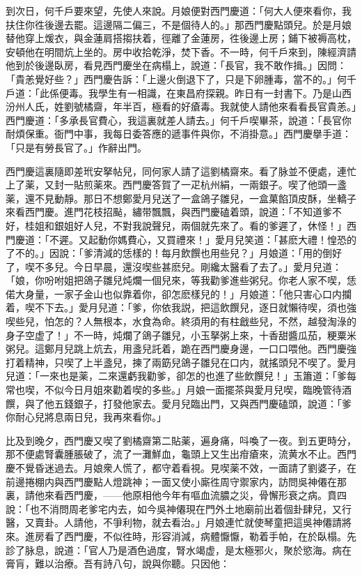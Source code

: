 到次日，何千戶要來望，先使人來說。月娘便對西門慶道：「何大人便來看你，我扶住你徃後邊去罷。這邊隔二偏三，不是個待人的。」那西門慶點頭兒。於是月娘替他穿上煖衣，與金蓮肩搭搊扶着，徑離了金蓮房，徃後邊上房；鋪下被褥高枕，安頓他在明間炕上坐的。房中收拾乾淨，焚下香。不一時，何千戶來到，陳經濟請他到於後邊臥房，看見西門慶坐在病榻上，說道：「長官，我不敢作揖。」因問：「貴恙覺好些？」西門慶告訴：「上邊火倒退下了，只是下卵腫毒，當不的。」何千戶道：「此係便毒。我學生有一相識，在東昌府探親。昨日有一封書下。乃是山西汾州人氏，姓劉號橘齋，年半百，極看的好瘡毒。我就使人請他來看看長官貴恙。」西門慶道：「多承長官費心，我這裏就差人請去。」何千戶喫畢茶，說道：「長官你耐煩保重。衙門中事，我每日委答應的遞事件與你，不消掛意。」西門慶擧手道：「只是有勞長官了。」作辭出門。

西門慶這裏隨即差玳安拏帖兒，同何家人請了這劉橘齋來。看了脉並不便處，連忙上了薬，又封一貼煎薬來。西門慶答賀了一疋杭州絹，一兩銀子。喫了他頭一盞薬，還不見動靜。那日不想鄭愛月兒送了一盒鴿子雛兒，一盒菓餡頂皮酥，坐轎子來看西門慶。進門花枝招颭，繡带飄飄，與西門慶磕着頭，說道：「不知道爹不好，桂姐和銀姐好人兒，不對我說聲兒，兩個就先來了。看的爹遲了，休怪！」西門慶道：「不遲。又起動你媽費心，又買禮來！」愛月兒笑道：「甚麽大禮！惶恐的了不的。」因說：「爹清減的恁樣的！每月飲饌也用些兒？」月娘道：「用的倒好了，喫不多兒。今日早晨，還沒喫些甚麽兒。剛纔太醫看了去了。」愛月兒道：「娘，你吩咐姐把鴿子雛兒炖爛一個兒來，等我勸爹進些粥兒。你老人家不喫，恁偌大身量，一家子金山也似靠着你，卻怎麽樣兒的！」月娘道：「他只害心口内攔着，喫不下去。」愛月兒道：「爹，你依我説，把這飲饌兒，逐日就懶待喫，須也強喫些兒，怕怎的？人無根本，水食為命。終須用的有柱戧些兒，不然，越發淘淥的身子空虚了！」不一時，炖爛了鴿子雛兒，小玉拏粥上來，十香甜醬瓜茄，粳粟米粥兒。這鄭月兒跳上炕去，用盞兒託着，跪在西門慶身邊，一口口喂他。西門慶強打着精神，只喫了上半盞兒，揀了兩筯兒鴿子雛兒在口内，就搖頭兒不喫了。愛月兒道：「一來也是薬，二來還虧我勸爹，卻怎的也進了些飲饌兒！」玉簫道：「爹每常也喫，不似今日月姐來勸着喫的多些。」月娘一面擺茶與愛月兒喫，臨晚管待酒饌，與了他五錢銀子，打發他家去。愛月兒臨出門，又與西門慶磕頭，說道：「爹你耐心兒將息兩日兒，我再來看你。」

比及到晚夕，西門慶又喫了劉橘齋第二貼薬，遍身痛，呌喚了一夜。到五更時分，那不便處腎囊腫脹破了，流了一灘鮮血，龜頭上又生出疳瘡來，流黄水不止。西門慶不覺昏迷過去。月娘衆人慌了，都守着看視。見喫薬不效，一面請了劉婆子，在前邊捲棚内與西門慶點人燈跳神；一面又使小廝徃周守禦家内，訪問吳神僊在那裏，請他來看西門慶，——他原相他今年有嘔血流膿之災，骨懈形衰之病。賁四說：「也不消問周老爹宅内去，如今吳神僊現在門外土地廟前出着個卦肆兒，又行醫，又賣卦。人請他，不爭利物，就去看治。」月娘連忙就使琴童把這吳神僊請將來。進房看了西門慶，不似徃時，形容消減，病體懨懨，勒着手帕，在於臥榻。先診了脉息，說道：「官人乃是酒色過度，腎水竭虚，是太極邪火，聚於慾海。病在膏肓，難以治療。吾有詩八句，說與你聽。只因他：


